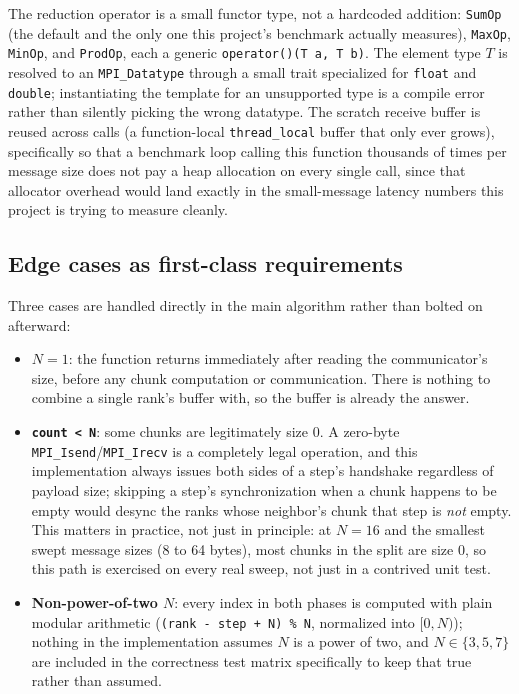 The reduction operator is a small functor type, not a hardcoded addition: \texttt{SumOp} (the default and the only one this project's benchmark actually measures), \texttt{MaxOp}, \texttt{MinOp}, and \texttt{ProdOp}, each a generic \texttt{operator()(T a, T b)}. The element type $T$ is resolved to an \texttt{MPI\_Datatype} through a small trait specialized for \texttt{float} and \texttt{double}; instantiating the template for an unsupported type is a compile error rather than silently picking the wrong datatype. The scratch receive buffer is reused across calls (a function-local \texttt{thread\_local} buffer that only ever grows), specifically so that a benchmark loop calling this function thousands of times per message size does not pay a heap allocation on every single call, since that allocator overhead would land exactly in the small-message latency numbers this project is trying to measure cleanly.

\subsection{Edge cases as first-class requirements}

Three cases are handled directly in the main algorithm rather than bolted on afterward:

\begin{itemize}
  \item \textbf{$N=1$}: the function returns immediately after reading the communicator's size, before any chunk computation or communication. There is nothing to combine a single rank's buffer with, so the buffer is already the answer.
  \item \textbf{\texttt{count < N}}: some chunks are legitimately size 0. A zero-byte \texttt{MPI\_Isend}/\texttt{MPI\_Irecv} is a completely legal operation, and this implementation always issues both sides of a step's handshake regardless of payload size; skipping a step's synchronization when a chunk happens to be empty would desync the ranks whose neighbor's chunk that step is \emph{not} empty. This matters in practice, not just in principle: at $N=16$ and the smallest swept message sizes (8 to 64 bytes), most chunks in the split are size 0, so this path is exercised on every real sweep, not just in a contrived unit test.
  \item \textbf{Non-power-of-two $N$}: every index in both phases is computed with plain modular arithmetic (\texttt{(rank - step + N) \% N}, normalized into $[0, N)$); nothing in the implementation assumes $N$ is a power of two, and $N \in \{3, 5, 7\}$ are included in the correctness test matrix specifically to keep that true rather than assumed.
\end{itemize}

